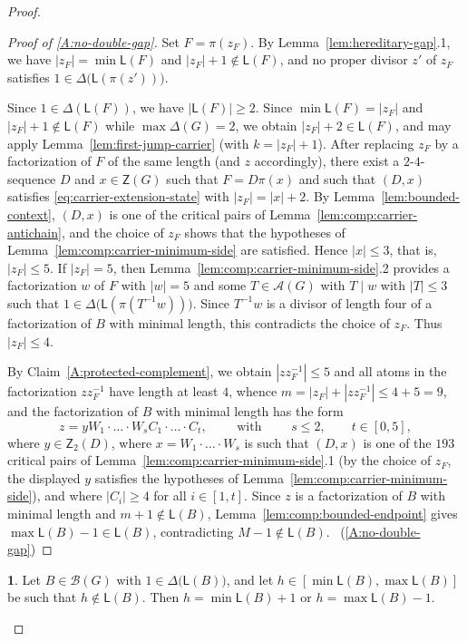 \documentclass[a4paper, 10pt]{amsart}
\theoremstyle{plain}
\theoremstyle{definition}
\theoremstyle{definition}
\newtheorem{claim}{}[theorem]
\numberwithin{equation}{section}
\begin{document}
\begin{proof}
\begin{proof}[Proof of \ref{A:no-double-gap}]
Set $F = \pi (z_F)$.  By  Lemma~\ref{lem:hereditary-gap}.1, we have
$|z_F| = \min \mathsf L (F)$ and $|z_F|+1 \notin \mathsf L (F)$, and no
proper divisor $z'$ of $z_F$ satisfies
$1 \in \Delta \big(\mathsf L (\pi (z')) \big)$.

Since $1 \in \Delta (\mathsf L (F) )$, we have $|\mathsf L (F)|\ge 2$.  Since
$\min \mathsf L (F) = |z_F|$ and $|z_F| + 1 \notin \mathsf L (F)$ while
$\max\Delta (G)=2$, we obtain $|z_F| + 2\in\mathsf L (F)$,
and may apply Lemma~\ref{lem:first-jump-carrier} (with $k=|z_F| + 1$).  After
replacing $z_F$ by a factorization of $F$ of the same length (and $z$
accordingly), there exist a $2$-$4$-sequence $D$ and $x\in \mathsf Z(G)$ such that $F=D\pi(x)$ and such that $(D,x)$ satisfies
\eqref{eq:carrier-extension-state} with $|z_F| = |x|+2$.
  By
Lemma~\ref{lem:bounded-context}, $(D,x)$ is one of the critical pairs of
Lemma~\ref{lem:comp:carrier-antichain}, and the choice of $z_F$ shows that
the hypotheses of Lemma~\ref{lem:comp:carrier-minimum-side} are satisfied.
Hence $|x| \le 3$, that is, $|z_F| \le 5$.  If $|z_F| = 5$, then
Lemma~\ref{lem:comp:carrier-minimum-side}.2 provides a factorization $w$
of $F$ with $|w| = 5$ and some $T\in \mathcal A(G)$ with $T \mid w$ with $|T| \le 3$ such that
$1 \in \Delta \big( \mathsf L (\pi (T^{-1}w)) \big)$. Since $T^{-1}w$ is a divisor of length four of a  factorization of $B$ with minimal length, this contradicts the
choice of $z_F$.  Thus $|z_F| \le 4$.  

By Claim~\ref{A:protected-complement}, we obtain  $|zz_F^{-1}|\le 5$  and all atoms in the factorization $zz_F^{-1}$ have length at least $4$, whence 
$m=|z_F|+|zz_F^{-1}| \le 4+5 = 9$, and the  factorization of $B$ with minimal length has the form
\[
 z = y W_1 \cdot \ldots \cdot W_s C_1\cdot \ldots \cdot C_t, \qquad\text{ with }
 \qquad s\le2,
 \qquad t \in [0, 5],
\]
where $y \in \mathsf Z_2 (D)$, where $x = W_1 \cdot \ldots \cdot W_s$ is such
that $(D,x)$ is one of the $193$ critical pairs of
Lemma~\ref{lem:comp:carrier-minimum-side}.1 (by the choice of $z_F$, the
displayed $y$ satisfies the hypotheses of Lemma~\ref{lem:comp:carrier-minimum-side}), and where $|C_i| \ge 4$ for all
$i \in [1,t]$.  Since $z$ is a factorization of $B$ with minimal length and
$m+1 \notin \mathsf L (B)$, Lemma~\ref{lem:comp:bounded-endpoint} gives
$\max \mathsf L (B) - 1 \in \mathsf L (B)$, contradicting
$M-1 \notin \mathsf L (B)$.
\qedhere\ (\ref{A:no-double-gap})
\end{proof}


\begin{claim}\label{A:endpoint-hole}
Let $B \in \mathcal B (G)$ with $1 \in \Delta \big(\mathsf L (B) \big)$, and let $h\in [\min\mathsf L(B), \max\mathsf L(B)]$ be such that  $h\not\in\mathsf L (B)$.  Then $h = \min \mathsf L (B) +1$ or $h = \max \mathsf L (B)-1$.
\end{claim}


\end{proof}
\end{document}
